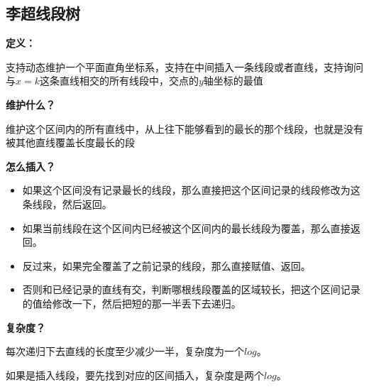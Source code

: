 \subsection{李超线段树}
\textbf{定义：}\par
支持动态维护一个平面直角坐标系，支持在中间插入一条线段或者直线，支持询问与$x = k$这条直线相交的所有线段中，交点的$y$轴坐标的最值\par
\textbf{维护什么？}\par
维护这个区间内的所有直线中，从上往下能够看到的最长的那个线段，也就是没有被其他直线覆盖长度最长的段\par
\textbf{怎么插入？}\par
\begin{itemize}
\item 如果这个区间没有记录最长的线段，那么直接把这个区间记录的线段修改为这条线段，然后返回。
\item 如果当前线段在这个区间内已经被这个区间内的最长线段为覆盖，那么直接返回。
\item 反过来，如果完全覆盖了之前记录的线段，那么直接赋值、返回。
\item 否则和已经记录的直线有交，判断哪根线段覆盖的区域较长，把这个区间记录的值给修改一下，然后把短的那一半丢下去递归。
\end{itemize} \par
\textbf{复杂度？}\par
每次递归下去直线的长度至少减少一半，复杂度为一个$log$。 \par
如果是插入线段，要先找到对应的区间插入，复杂度是两个$log$。\par

